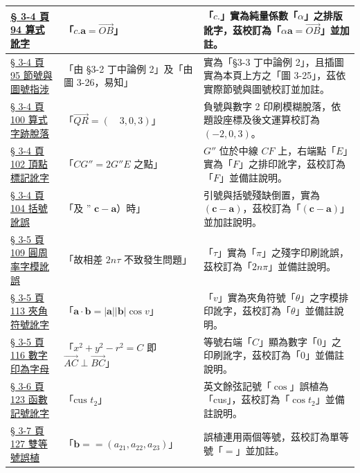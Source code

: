 \documentclass[a4paper,12pt,twoside]{article}
\begin{document}
\begin{table}[H]
\begin{tabularx}{\textwidth}{|p{3.2cm}|p{3.8cm}|X|}
\hyperref[note:b3-ch3-p94-alpha-c-typo]{§ 3-4 頁 94 算式訛字} & 
「$c.\mathbf{a} = \vec{OB}$」 & 
「$c.$」實為純量係數「$\alpha$」之排版訛字，茲校訂為「$\alpha\mathbf{a} = \vec{OB}$」並加註。 \\ \hline

\hyperref[note:b3-ch3-p95-ex2-ref]{§ 3-4 頁 95 節號與圖號指涉} & 
「由 §3-2 丁中論例 2」及「由圖 3-26，易知」 & 
實為「§3-3 丁中論例 2」，且插圖實為本頁上方之「圖 3-25」，茲依實際節號與圖號校訂並加註。 \\ \hline

\hyperref[note:b3-ch3-p100-qr-typo]{§ 3-4 頁 100 算式字跡脫落} & 
「$\vec{QR} = (\quad 3, 0, 3)$」 & 
負號與數字 2 印刷模糊脫落，依題設座標及後文運算校訂為 $(-2, 0, 3)$。 \\ \hline

\hyperref[note:b3-ch3-p102-ge-typo]{§ 3-4 頁 102 頂點標記訛字} & 
「$CG'' = 2G''E$ 之點」 & 
$G''$ 位於中線 $CF$ 上，右端點「$E$」實為「$F$」之排印訛字，茲校訂為「$F$」並備註說明。 \\ \hline

\hyperref[note:b3-ch3-p104-prob7-typo]{§ 3-4 頁 104 括號訛誤} & 
「及 $\text{'' }\mathbf{c}-\mathbf{a}$）時」 & 
引號與括號殘缺倒置，實為 $(\mathbf{c}-\mathbf{a})$，茲校訂為「$(\mathbf{c}-\mathbf{a})$」並加註說明。 \\ \hline

\hyperref[note:b3-ch3-p109-tau-typo]{§ 3-5 頁 109 圓周率字模訛誤} & 
「故相差 $2n\tau$ 不致發生問題」 & 
「$\tau$」實為「$\pi$」之殘字印刷訛誤，茲校訂為「$2n\pi$」並備註說明。 \\ \hline

\hyperref[note:b3-ch3-p113-cos-theta-typo]{§ 3-5 頁 113 夾角符號訛字} & 
「$\mathbf{a}\cdot\mathbf{b} = |\mathbf{a}||\mathbf{b}|\cos v$」 & 
「$v$」實為夾角符號「$\theta$」之字模排印訛字，茲校訂為「$\theta$」並備註說明。 \\ \hline

\hyperref[note:b3-ch3-p116-ac-bc-zero]{§ 3-5 頁 116 數字印為字母} & 
「$x^2+y^2-r^2 = C$ 即 $\vec{AC}\perp\vec{BC}$」 & 
等號右端「$C$」顯為數字「$0$」之印刷訛字，茲校訂為「$0$」並備註說明。 \\ \hline

\hyperref[note:b3-ch3-p123-cust2-typo]{§ 3-6 頁 123 函數記號訛字} & 
「$\text{cus } t_2$」 & 
英文餘弦記號「$\cos$」誤植為「cus」，茲校訂為「$\cos t_2$」並備註說明。 \\ \hline

\hyperref[note:b3-ch3-p127-double-eq]{§ 3-7 頁 127 雙等號誤植} & 
「$\mathbf{b} == (a_{21}, a_{22}, a_{23})$」 & 
誤植連用兩個等號，茲校訂為單等號「$=$」並加註。 \\ \hline

\end{tabularx}
\end{table}

\clearpage
\tableofcontents
\newpage

\setcounter{section}{2}

\end{document}
